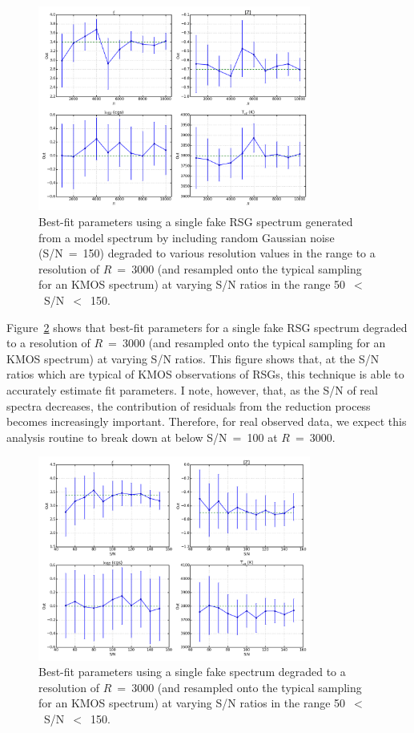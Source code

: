 \begin{figure}
 \centering
 \includegraphics[width=0.80\textwidth]{JAnal/Fakespec-tres-v1}
 \caption[The effects of varying the resolution on the best-fit parameters]{
Best-fit parameters using a single fake RSG spectrum generated from a model spectrum by including random Gaussian noise (S/N~=~150) degraded to various resolution values in the range  to a resolution of $R$~=~3000 (and resampled onto the typical sampling for an KMOS spectrum) at varying S/N ratios in the range 50~$<$~S/N~$<$~150.
\label{fig:tres}
         }
\end{figure}

Figure~\ref{fig:snr} shows that best-fit parameters for a single fake RSG spectrum degraded to a resolution of $R$~=~3000 (and resampled onto the typical sampling for an KMOS spectrum) at varying S/N ratios.
This figure shows that, at the S/N ratios which are typical of KMOS observations of RSGs, this technique is able to accurately estimate fit parameters.
I note, however, that, as the S/N of real spectra decreases, the contribution of residuals from the reduction process becomes increasingly important.
Therefore, for real observed data, we expect this analysis routine to break down at below S/N~=~100 at $R$~=~3000.

\begin{figure}
 \centering
 \includegraphics[width=0.80\textwidth]{JAnal/Fakespec-tsnr-v1}
 \caption[The effects of varying the S/N on the best-fit parameters]{
Best-fit parameters using a single fake spectrum degraded to a resolution of $R$~=~3000 (and resampled onto the typical sampling for an KMOS spectrum) at varying S/N ratios in the range 50~$<$~S/N~$<$~150.
\label{fig:snr}
         }
\end{figure}


